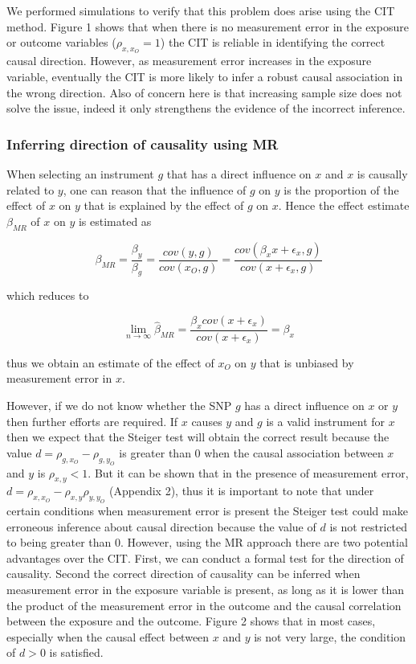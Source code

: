 \documentclass[]{article}
\begin{document}
We performed simulations to verify that this problem does arise using
the CIT method. Figure 1 shows that when there is no measurement error
in the exposure or outcome variables (\(\rho_{x, x_O}=1\)) the CIT is
reliable in identifying the correct causal direction. However, as
measurement error increases in the exposure variable, eventually the CIT
is more likely to infer a robust causal association in the wrong
direction. Also of concern here is that increasing sample size does not
solve the issue, indeed it only strengthens the evidence of the
incorrect inference.

\subsubsection{Inferring direction of causality using
MR}\label{inferring-direction-of-causality-using-mr}

When selecting an instrument \(g\) that has a direct influence on \(x\)
and \(x\) is causally related to \(y\), one can reason that the
influence of \(g\) on \(y\) is the proportion of the effect of \(x\) on
\(y\) that is explained by the effect of \(g\) on \(x\). Hence the
effect estimate \(\beta_{MR}\) of \(x\) on \(y\) is estimated as

\[
\beta_{MR} = \frac{\beta_y}{\beta_g} = \frac{cov(y, g)}{cov(x_O, g)} = \frac{cov(\beta_x x + \epsilon_x, g)}{cov(x + \epsilon_x, g)}
\]

which reduces to

\[
\lim_{n \to \infty} \hat{\beta}_{MR} = \frac{\beta_x cov(x + \epsilon_x)}{cov(x + \epsilon_x)} = \beta_x
\]

thus we obtain an estimate of the effect of \(x_O\) on \(y\) that is
unbiased by measurement error in \(x\).

However, if we do not know whether the SNP \(g\) has a direct influence
on \(x\) or \(y\) then further efforts are required. If \(x\) causes
\(y\) and \(g\) is a valid instrument for \(x\) then we expect that the
Steiger test will obtain the correct result because the value
\(d = \rho_{g, x_O} - \rho_{g, y_O}\) is greater than 0 when the causal
association between \(x\) and \(y\) is \(\rho_{x, y} < 1\). But it can
be shown that in the presence of measurement error,
\(d = \rho_{x, x_O} - \rho_{x,y}\rho_{y,y_O}\) (Appendix 2), thus it is
important to note that under certain conditions when measurement error
is present the Steiger test could make erroneous inference about causal
direction because the value of \(d\) is not restricted to being greater
than 0. However, using the MR approach there are two potential
advantages over the CIT. First, we can conduct a formal test for the
direction of causality. Second the correct direction of causality can be
inferred when measurement error in the exposure variable is present, as
long as it is lower than the product of the measurement error in the
outcome and the causal correlation between the exposure and the outcome.
Figure 2 shows that in most cases, especially when the causal effect
between \(x\) and \(y\) is not very large, the condition of \(d > 0\) is
satisfied.
\end{document}
